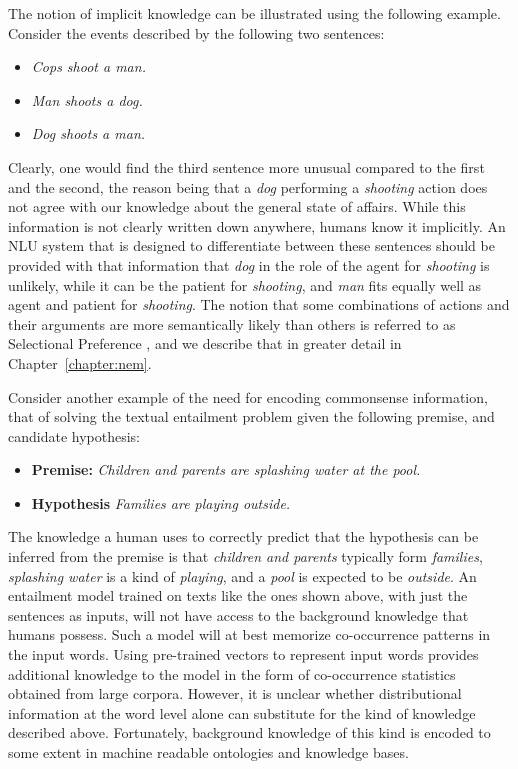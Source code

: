 The notion of implicit knowledge can be illustrated using the following example. Consider the
events described by the following two sentences:

\begin{itemize}
 \item[] \textit{Cops shoot a man.}
 \item[] \textit{Man shoots a dog.}
 \item[] \textit{Dog shoots a man.}
\end{itemize}

Clearly, one would find the third sentence more unusual compared to the first and the second, the reason being that
a \emph{dog} performing a \emph{shooting} action does not agree with our knowledge about the general state
of affairs. While this information is not clearly written down anywhere, humans know it implicitly. An NLU
system that is designed to differentiate between these sentences should be provided with that information
that \emph{dog} in the role of the agent for \emph{shooting} is unlikely, while it can be the patient for
\emph{shooting}, and \emph{man} fits equally well as agent and patient for \emph{shooting}. The notion that
some combinations of actions and their arguments are more semantically likely than others is referred to as
Selectional Preference \citep{wilks1973preference}, and we describe that in greater detail in Chapter~\ref{chapter:nem}.

Consider another example of the need for encoding commonsense information, that of solving the 
textual entailment problem given the following premise, and candidate hypothesis:
\begin{itemize}
 \item[] \textbf{Premise:} \textit{Children and parents are splashing water at the pool.}
 \item[] \textbf{Hypothesis} \textit{Families are playing outside.}
\end{itemize}
The knowledge a human uses to correctly predict that the hypothesis can be inferred from the 
premise is that \textit{children and parents} typically form \textit{families}, \textit{splashing water} 
is a kind of \textit{playing}, and a \textit{pool} is expected to be \textit{outside}. An entailment model trained on texts like the
ones shown above, with just the sentences as inputs, will not have access to the background knowledge that humans possess.
Such a model will at best memorize co-occurrence patterns in the input words. Using pre-trained vectors to represent input words provides additional
knowledge to the model in the form of co-occurrence statistics obtained from large corpora. However, it is unclear whether distributional
information at the word level alone can substitute for the kind of knowledge described above.
Fortunately, background knowledge of this kind is encoded to some extent in machine readable
ontologies and knowledge bases.

